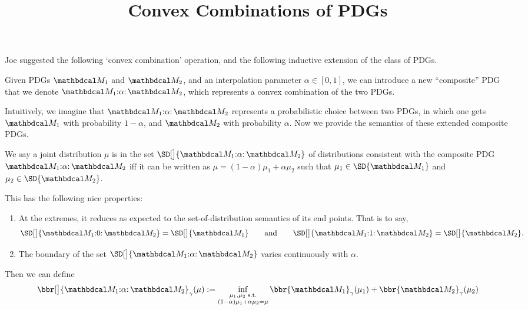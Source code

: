 \documentclass{article}
\title{Convex Combinations of PDGs}
\begin{document}
\maketitle

Joe suggested the following `convex combination' operation, and the following inductive extension of the class of PDGs.

\begin{defn}
    Given PDGs $\dg M_1$ and $\dg M_2$, and an interpolation parameter $\alpha \in [0,1]$, we can introduce a new ``composite'' PDG that we denote $\dg M_1 {:} \alpha {:}\, \dg M_2$, which represents a convex combination of the two PDGs.
\end{defn}

Intuitively, we imagine that $\dg M_1 {:} \alpha {:}\, \dg M_2$ represents a probabilistic choice between two PDGs, in which one gets $\dg M_1$ with probability $1-\alpha$, and $\dg M_2$ with probability $\alpha$. 
Now we provide the semantics of these extended composite PDGs. 

\begin{defn}
    We say a joint distribution $\mu$ is in the set
    $
        \SD[\big]{\dg M_1 {:} \alpha {:}\, \dg M_2}
    $
    of distributions consistent with the composite PDG 
    $\dg M_1 {:} \alpha {:}\, \dg M_2$
    iff 
    it can be written as $\mu = (1-\alpha)\mu_1 + \alpha \mu_2$ such that
    $\mu_1 \in \SD{\dg M_1}$ and
    $\mu_2 \in \SD{\dg M_2}$.
\end{defn}

This has the following nice properties:
\begin{enumerate}
    \item At the extremes, it reduces as expected to the set-of-distribution semantics of its end points. That is to say, 
    \[
        \SD[\big]{\dg M_1 {:} 0 {:}\, \dg M_2} = \SD[\big]{\dg M_1}
            \qquad\text{and}\qquad
        \SD[\big]{\dg M_1 {:} 1 {:}\, \dg M_2} = \SD[\big]{\dg M_2}.
    \]
    
    \item The boundary of the set $\SD[\big]{\dg M_1 {:} \alpha {:}\, \dg M_2}$ varies continuously with $\alpha$. 
\end{enumerate}


\begin{defn}
    Then we can define
    \[
        \bbr[\big]{\dg M_1 {:} \alpha {:}\, \dg M_2}_\gamma (\mu)
            := 
            \inf_{\substack{\mu_1, \mu_2 \text{ s.t.} \\ 
                (1-\alpha) \mu_1 +\alpha \mu_2 = \mu}}
            \bbr{\dg M_1}_\gamma(\mu_1) + \bbr{\dg M_2}_\gamma(\mu_2) 
    \]
\end{defn}
\end{document}
